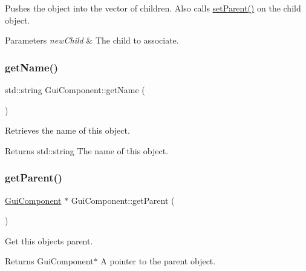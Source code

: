 Pushes the object into the vector of children. Also calls \mbox{\hyperlink{class_gui_component_a526481fb2424c1ea771e78be27a091f9}{set\+Parent()}} on the child object. 


\begin{DoxyParams}{Parameters}
{\em new\+Child} & The child to associate. \\
\hline
\end{DoxyParams}
\mbox{\label{class_gui_component_a521f21d8ae5369fe255a1209fcd3bd0f}} 
\subsubsection{\texorpdfstring{get\+Name()}{getName()}}
{\footnotesize\ttfamily std\+::string Gui\+Component\+::get\+Name (\begin{DoxyParamCaption}{ }\end{DoxyParamCaption})}



Retrieves the name of this object. 

\begin{DoxyReturn}{Returns}
std\+::string The name of this object. 
\end{DoxyReturn}
\mbox{\label{class_gui_component_aba1969f731ef56396a1e69e50ff1f8fb}} 
\subsubsection{\texorpdfstring{get\+Parent()}{getParent()}}
{\footnotesize\ttfamily \mbox{\hyperlink{class_gui_component}{Gui\+Component}} $\ast$ Gui\+Component\+::get\+Parent (\begin{DoxyParamCaption}{ }\end{DoxyParamCaption})}



Get this object\textquotesingle{}s parent. 

\begin{DoxyReturn}{Returns}
Gui\+Component$\ast$ A pointer to the parent object. 
\end{DoxyReturn}
\mbox{\label{class_gui_component_ac979fb459db6feda90bc7c11a6a60623}} 
